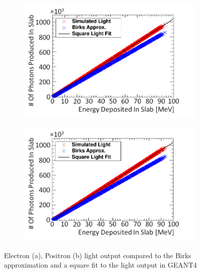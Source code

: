 \begin{figure}[!h]
\centering
\begin{subfigure}{.5\textwidth}
  \centering
  \includegraphics[width=\linewidth]{Chapter4/Figs/Raster/electronSimulatedLightNew.png}
  \captionsetup{width=.9\linewidth}
  \caption{}
  \label{subFig:electron_light}
\end{subfigure}%
\begin{subfigure}{.5\textwidth}
  \centering
  \includegraphics[width=\linewidth]{Chapter4/Figs/Raster/positronSimulatedLightNew.png}
  \captionsetup{width=.9\linewidth}
  \caption{}
  \label{subFig:positron_light}
\end{subfigure}
\caption{Electron (a), Positron (b) light output compared to the Birks approximation and a square fit to the light output in GEANT4}
\label{fig:electron_positron_light}
\end{figure}

